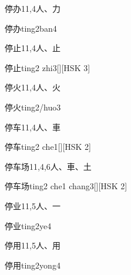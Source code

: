 \begin{Entry}{停办}{11,4}{⼈、⼒}
  \begin{Phonetics}{停办}{ting2ban4}
  \end{Phonetics}
\end{Entry}

\begin{Entry}{停止}{11,4}{⼈、⽌}
  \begin{Phonetics}{停止}{ting2 zhi3}[][HSK 3]
  \end{Phonetics}
\end{Entry}

\begin{Entry}{停火}{11,4}{⼈、⽕}
  \begin{Phonetics}{停火}{ting2/huo3}
  \end{Phonetics}
\end{Entry}

\begin{Entry}{停车}{11,4}{⼈、⾞}
  \begin{Phonetics}{停车}{ting2 che1}[][HSK 2]
  \end{Phonetics}
\end{Entry}

\begin{Entry}{停车场}{11,4,6}{⼈、⾞、⼟}
  \begin{Phonetics}{停车场}{ting2 che1 chang3}[][HSK 2]
  \end{Phonetics}
\end{Entry}

\begin{Entry}{停业}{11,5}{⼈、⼀}
  \begin{Phonetics}{停业}{ting2ye4}
  \end{Phonetics}
\end{Entry}

\begin{Entry}{停用}{11,5}{⼈、⽤}
  \begin{Phonetics}{停用}{ting2yong4}
  \end{Phonetics}
\end{Entry}

